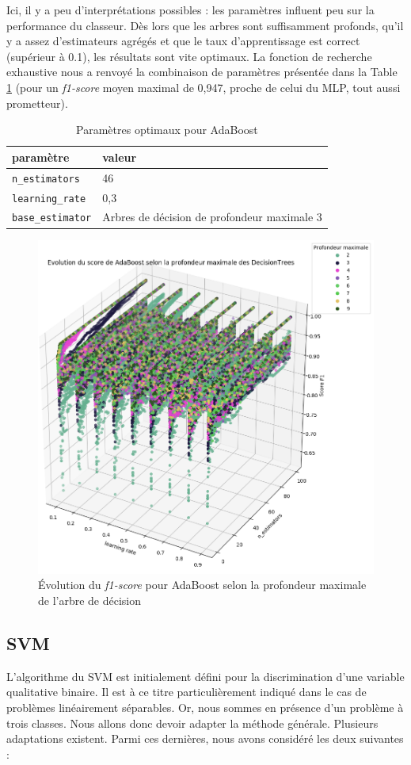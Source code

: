 \documentclass[a4paper]{report}
\begin{document}
Ici, il y a peu d'interprétations possibles : les paramètres influent peu sur la performance du classeur. Dès lors que les arbres sont suffisamment profonds, qu'il y a assez d'estimateurs agrégés et que le taux d'apprentissage est correct (supérieur à 0.1), les résultats sont vite optimaux. La fonction de recherche exhaustive nous a renvoyé la combinaison de paramètres présentée dans la Table \ref{best_params_ada} (pour un \emph{f1-score} moyen maximal de 0,947, proche de celui du MLP, tout aussi prometteur).

\begin{table}[h]
\centering
\begin{tabular}{ll}
paramètre & valeur \\
\hline
\texttt{n\_estimators} & 46 \\
\texttt{learning\_rate} & 0,3 \\
\texttt{base\_estimator} & Arbres de décision de profondeur maximale 3\\
\end{tabular}
\caption{Paramètres optimaux pour AdaBoost\label{best_params_ada}}
\end{table}

\begin{figure}[h]
\centering
\includegraphics[width=.63\textwidth]{img/adaboost_depth.png}
\caption{Évolution du \emph{f1-score} pour AdaBoost selon la profondeur maximale de l'arbre de décision\label{adaboost_depth}}
\end{figure}

\subsection{SVM}

L'algorithme du SVM est initialement défini pour la discrimination d'une variable qualitative binaire. Il est à ce titre particulièrement indiqué dans le cas de problèmes linéairement séparables. Or, nous sommes en présence d'un problème à trois classes. Nous allons donc devoir adapter la méthode générale. Plusieurs adaptations existent. Parmi ces dernières, nous avons considéré les deux suivantes :
\end{document}
